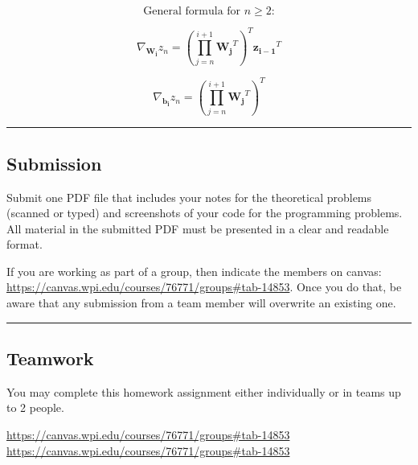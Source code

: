\documentclass[
  letterpaper,
  DIV=11,
  numbers=noendperiod]{scrartcl}
\begin{document}
\[\text{General formula for } n \geq 2\text{:}\]

\[\nabla_{\mathbf{W_i}}z_n = \left(\prod_{j=n}^{i+1} \mathbf{W_j}^T\right)^T \mathbf{z_{i-1}}^T\]

\[\nabla_{\mathbf{b_i}}z_n = \left(\prod_{j=n}^{i+1} \mathbf{W_j}^T\right)^T\]

\begin{center}\rule{0.5\linewidth}{0.5pt}\end{center}

\subsection{Submission}\label{submission}

Submit one PDF file that includes your notes for the theoretical
problems (scanned or typed) and screenshots of your code for the
programming problems. All material in the submitted PDF must be
presented in a clear and readable format.

If you are working as part of a group, then indicate the members on
canvas: \url{https://canvas.wpi.edu/courses/76771/groups\#tab-14853}.
Once you do that, be aware that any submission from a team member will
overwrite an existing one.

\begin{center}\rule{0.5\linewidth}{0.5pt}\end{center}

\subsection{Teamwork}\label{teamwork}

You may complete this homework assignment either individually or in
teams up to 2 people.

\url{https://canvas.wpi.edu/courses/76771/groups\#tab-14853}
\url{https://canvas.wpi.edu/courses/76771/groups\#tab-14853}
\end{document}
